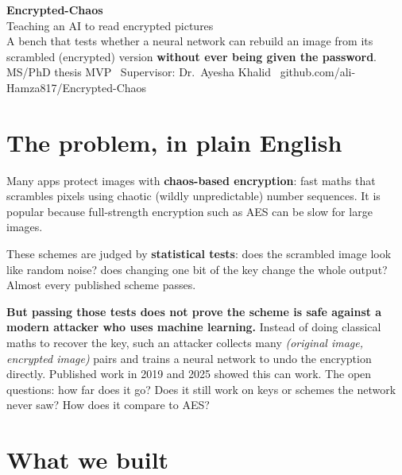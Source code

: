 \documentclass[11pt]{article}
\newcommand{\term}[1]{\textbf{#1}}
\begin{document}
\begin{tcolorbox}[enhanced, colback=ink, colframe=ink, arc=4pt,
  left=16pt, right=16pt, top=13pt, bottom=13pt, coltext=white]
  {\fontsize{24}{26}\selectfont\bfseries Encrypted\textcolor{brand}{-}Chaos}\\[3pt]
  {\large Teaching an AI to read encrypted pictures}\\[7pt]
  {\color{white!70}\small
  A bench that tests whether a neural network can rebuild an image from its
  scrambled (encrypted) version \textbf{without ever being given the password}.}\\[9pt]
  {\color{white!55}\footnotesize\ttfamily
  MS/PhD thesis MVP \textbullet\ Supervisor: Dr.\ Ayesha Khalid \textbullet\
  github.com/ali-Hamza817/Encrypted-Chaos}
\end{tcolorbox}

\section{The problem, in plain English}

Many apps protect images with \term{chaos-based encryption}: fast maths that scrambles
pixels using chaotic (wildly unpredictable) number sequences. It is popular because
full-strength encryption such as AES can be slow for large images.

These schemes are judged by \term{statistical tests}: does the scrambled image look like
random noise? does changing one bit of the key change the whole output? Almost every
published scheme passes.

\begin{tcolorbox}[plaincard]
\textbf{But passing those tests does not prove the scheme is safe against a modern
attacker who uses machine learning.} Instead of doing classical maths to recover the key,
such an attacker collects many \emph{(original image, encrypted image)} pairs and trains a
neural network to undo the encryption directly. Published work in 2019 and 2025 showed this
can work. The open questions: how far does it go? Does it still work on keys or schemes the
network never saw? How does it compare to AES?
\end{tcolorbox}

\section{What we built}
\end{document}
